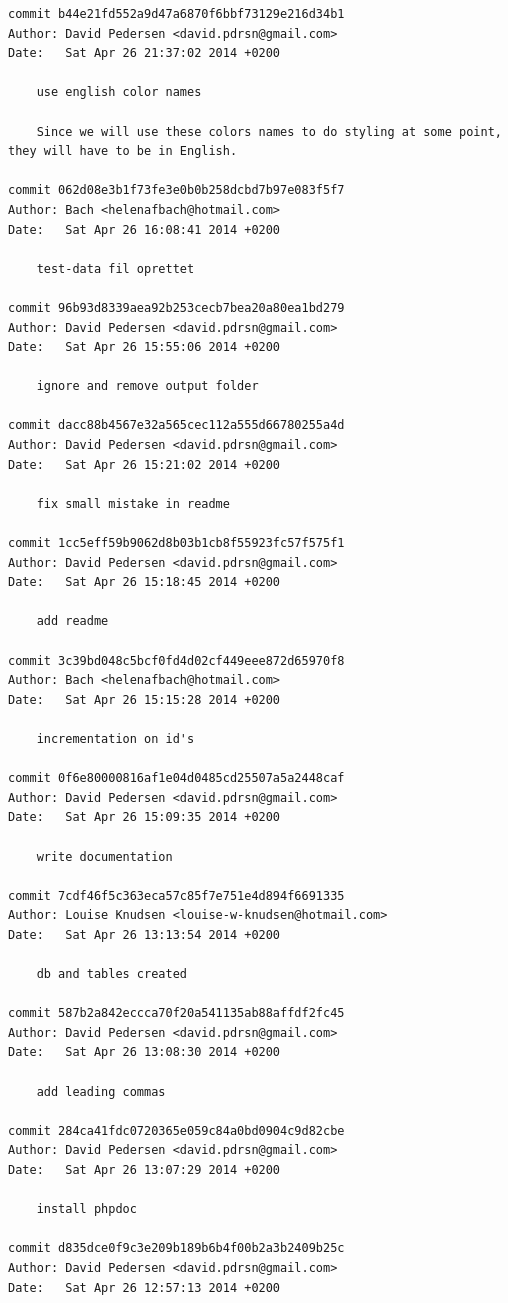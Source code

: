 \documentclass[12pt]{article}
\begin{document}
\begin{verbatim}
commit b44e21fd552a9d47a6870f6bbf73129e216d34b1
Author: David Pedersen <david.pdrsn@gmail.com>
Date:   Sat Apr 26 21:37:02 2014 +0200

    use english color names
    
    Since we will use these colors names to do styling at some point, they will have to be in English.

commit 062d08e3b1f73fe3e0b0b258dcbd7b97e083f5f7
Author: Bach <helenafbach@hotmail.com>
Date:   Sat Apr 26 16:08:41 2014 +0200

    test-data fil oprettet

commit 96b93d8339aea92b253cecb7bea20a80ea1bd279
Author: David Pedersen <david.pdrsn@gmail.com>
Date:   Sat Apr 26 15:55:06 2014 +0200

    ignore and remove output folder

commit dacc88b4567e32a565cec112a555d66780255a4d
Author: David Pedersen <david.pdrsn@gmail.com>
Date:   Sat Apr 26 15:21:02 2014 +0200

    fix small mistake in readme

commit 1cc5eff59b9062d8b03b1cb8f55923fc57f575f1
Author: David Pedersen <david.pdrsn@gmail.com>
Date:   Sat Apr 26 15:18:45 2014 +0200

    add readme

commit 3c39bd048c5bcf0fd4d02cf449eee872d65970f8
Author: Bach <helenafbach@hotmail.com>
Date:   Sat Apr 26 15:15:28 2014 +0200

    incrementation on id's

commit 0f6e80000816af1e04d0485cd25507a5a2448caf
Author: David Pedersen <david.pdrsn@gmail.com>
Date:   Sat Apr 26 15:09:35 2014 +0200

    write documentation

commit 7cdf46f5c363eca57c85f7e751e4d894f6691335
Author: Louise Knudsen <louise-w-knudsen@hotmail.com>
Date:   Sat Apr 26 13:13:54 2014 +0200

    db and tables created

commit 587b2a842eccca70f20a541135ab88affdf2fc45
Author: David Pedersen <david.pdrsn@gmail.com>
Date:   Sat Apr 26 13:08:30 2014 +0200

    add leading commas

commit 284ca41fdc0720365e059c84a0bd0904c9d82cbe
Author: David Pedersen <david.pdrsn@gmail.com>
Date:   Sat Apr 26 13:07:29 2014 +0200

    install phpdoc

commit d835dce0f9c3e209b189b6b4f00b2a3b2409b25c
Author: David Pedersen <david.pdrsn@gmail.com>
Date:   Sat Apr 26 12:57:13 2014 +0200


\end{verbatim}
\end{document}
